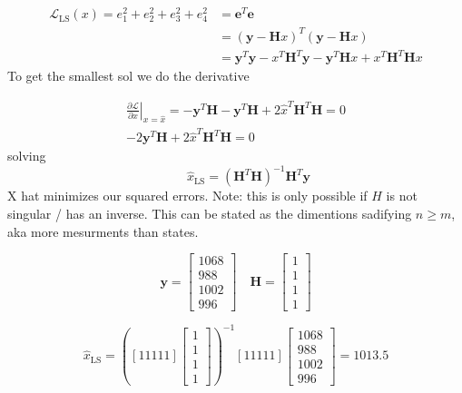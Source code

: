 \documentclass{article}
\begin{document}
\begin{equation}
\begin{aligned} 
  \mathscr{L}_{\mathrm{LS}}(x)=e_{1}^{2}+e_{2}^{2}+e_{3}^{2}+e_{4}^{2} 
&=\mathbf{e}^{T} \mathbf{e} \\ &=(\mathbf{y}-\mathbf{H} x)^{T}(\mathbf{y}-\mathbf{H} x) 
\\ &=\mathbf{y}^{T} \mathbf{y}-x^{T} \mathbf{H}^{T} \mathbf{y}-\mathbf{y}^{T} \mathbf{H} x+x^{T} 
\mathbf{H}^{T} \mathbf{H} x 
\end{aligned}
\end{equation}
To get the smallest sol we do the derivative 

\begin{equation}
\begin{aligned}
{ \left.\frac{\partial \mathscr{L}}{\partial x}\right|_{x=\hat{x}}=-\mathbf{y}^{T} \mathbf{H}-\mathbf{y}^{T} \mathbf{H}+2 \hat{x}^{T} \mathbf{H}^{T} \mathbf{H}=0} \\
 {-2 \mathbf{y}^{T} \mathbf{H}+2 \hat{x}^{T} \mathbf{H}^{T} \mathbf{H}=0    }
\end{aligned}
\end{equation}
solving
\begin{equation}
  {\qquad \hat{x}_{\mathrm{LS}}=\left(\mathbf{H}^{T} \mathbf{H}\right)^{-1} \mathbf{H}^{T} \mathbf{y}}
\end{equation}
X hat minimizes our squared errors. Note: this is only possible if $H$ is not singular / has an inverse. This can be stated as the dimentions sadifying $n \geq m$, aka more mesurments than states.

\begin{equation}\mathbf{y}=\left[\begin{array}{c}{1068} \\ {988} \\ {1002} \\ {996}\end{array}\right] \quad \mathbf{H}=\left[\begin{array}{l}{1} \\ {1} \\ {1} \\ {1}\end{array}\right]
\end{equation}



\begin{equation}
\hat{x}_{\mathrm{LS}}=\left([11111]\left[\begin{array}{l}{1} \\ {1} \\ {1} \\ {1}\end{array}\right]\right)^{-1}[11111]\left[\begin{array}{c}{1068} \\ {988} \\ {1002} \\ {996}\end{array}\right] = 1013.5
\end{equation}
\end{document}

